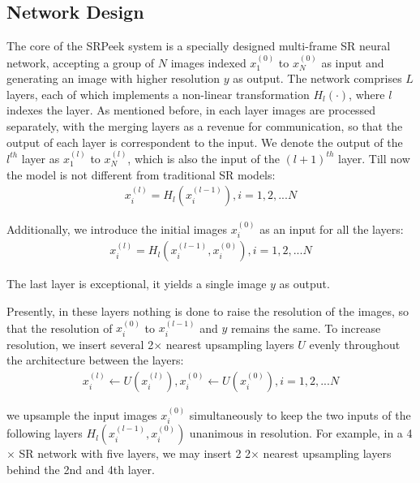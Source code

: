 \subsection{Network Design}
The core of the \textsf{SRPeek} system is a specially designed multi-frame SR neural network, accepting a group of $N$ images indexed $x_1^{(0)}$ to $x_N^{(0)}$ as input and generating an image with higher resolution $y$ as output. The network comprises $L$ layers, each of which implements a non-linear transformation $H_l(\cdot)$, where $l$ indexes the layer. As mentioned before, in each layer images are processed separately, with the merging layers as a revenue for communication, so that the output of each layer is correspondent to the input.  We denote the output of the $l^{th}$ layer as $x_1^{(l)}$ to $x_N^{(l)}$, which is also the input of the $(l+1)^{th}$ layer. Till now the model is not different from traditional SR models:
\begin{equation}\label{eq:1}
    \begin{split}
x_i^{(l)} = H_l(x_i^{(l-1)}), i=1,2,...N
\end{split}
\end{equation}


Additionally, we introduce the initial images $x_i^{(0)}$ as an input for all the layers:
\begin{equation}\label{eq:2}
    \begin{split}
        x_i^{(l)} = H_l(x_i^{(l-1)},x_i^{(0)}), i=1,2,...N
\end{split}
\end{equation}

The last layer is exceptional, it yields a single image $y$ as output. 

Presently, in these layers nothing is done to raise the resolution of the images, so that the resolution of $x_i^{(0)}$ to $x_i^{(l-1)}$ and $y$ remains the same. To increase resolution, we insert several 2$\times$ nearest upsampling layers $U$ evenly throughout the architecture between the layers:
\begin{equation}\label{eq:3}
    \begin{split}
        x_i^{(l)} \leftarrow U(x_i^{(l)}), x_i^{(0)} \leftarrow U(x_i^{(0)}), i=1,2,...N
\end{split}
\end{equation}

we upsample the input images $x_i^{(0)}$ simultaneously to keep the two inputs of the following layers $H_l(x_i^{(l-1)},x_i^{(0)})$ unanimous in resolution. For example, in a 4$\times$ SR network with five layers, we may insert 2 2$\times$ nearest upsampling layers behind the 2nd and 4th layer.

